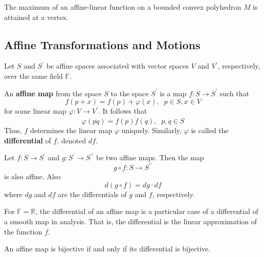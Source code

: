   \begin{theorem}
    The maximum of an affine-linear function on a bounded convex polyhedron $M$ is attained at a vertex. 
  \end{theorem}

\subsection{Affine Transformations and Motions}

  Let $S$ and $S^\prime$ be affine spaces associated with vector spaces $V$ and $V^\prime$, respectively, over the same field $\mathbb{F}$. 

  \begin{definition}
    An \textbf{affine map} from the space $S$ to the space $S^\prime$ is a map $f: S \longrightarrow S^\prime$ such that
    \begin{equation}
      f(p+x) = f(p) + \varphi(x), \;\; p \in S, x \in V
    \end{equation}
    for some linear map $\varphi: V \longrightarrow V^\prime$. It follows that
    \begin{equation}
      \varphi(\overline{pq}) = \overline{f(p) f(q)}, \;\; p, q \in S
    \end{equation}
    Thus, $f$ determines the linear map $\varphi$ uniquely. Similarly, $\varphi$ is called the \textbf{differential} of $f$, denoted $df$. 
  \end{definition}

  \begin{theorem}
    Let $f: S \longrightarrow S^\prime$ and $g: S^\prime \longrightarrow S^{\prime \prime}$ be two affine maps. Then the map
    \begin{equation}
      g \circ f : S \longrightarrow S^{\prime\prime}
    \end{equation}
    is also affine. Also
    \begin{equation}
      d(g \circ f) = dg \cdot df
    \end{equation}
    where $dg$ and $df$ are the differentials of $g$ and $f$, respectively. 
  \end{theorem}

  For $\mathbb{F} = \mathbb{R}$, the differential of an affine map is a particular case of a differential of a smooth map in analysis. That is, the differential is the linear approximation of the function $f$. 

  \begin{theorem}
    An affine map is bijective if and only if its differential is bijective. 
  \end{theorem}

